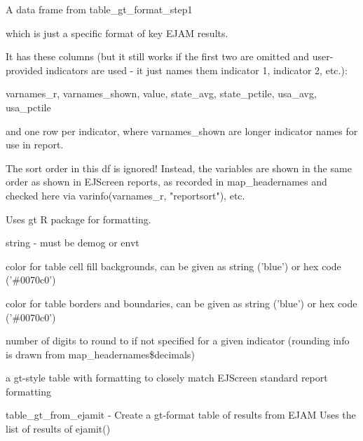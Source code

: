 \documentclass[a4paper]{book}
\begin{document}
\begin{Arguments}
\begin{ldescription}
\item[\code{df}] A data frame from table\_gt\_format\_step1

which is just a specific format of key EJAM results.

It has these columns (but it still works if the first two are omitted
and user-provided indicators are used - it just names them indicator 1, indicator 2, etc.):

varnames\_r, varnames\_shown, value, state\_avg, state\_pctile, usa\_avg, usa\_pctile

and one row per indicator, where varnames\_shown are longer indicator names for use in report.

The sort order in this df is ignored!  Instead, the variables are shown in the same order as
shown in EJScreen reports, as recorded in map\_headernames and checked here via varinfo(varnames\_r, "reportsort"), etc.

Uses gt R package for formatting.

\item[\code{type}] string - must be demog or envt

\item[\code{my\_cell\_color}] color for table cell fill backgrounds,  can be given as string ('blue') or hex code ('\#0070c0')

\item[\code{my\_border\_color}] color for table borders and boundaries, can be given as string ('blue') or hex code ('\#0070c0')

\item[\code{digits\_default}] number of digits to round to if not specified for a given indicator
(rounding info is drawn from map\_headernames\$decimals)
\end{ldescription}
\end{Arguments}
%
\begin{Value}
a gt-style table with formatting to closely match EJScreen standard report formatting
\end{Value}
%
\begin{SeeAlso}\relax
{}
\end{SeeAlso}
%
\begin{Description}\relax
table\_gt\_from\_ejamit - Create a gt-format table of results from EJAM
Uses the list of results of ejamit()
\end{Description}
\end{document}
